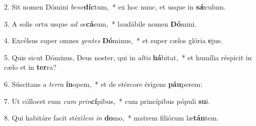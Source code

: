 2. Sit nomen Dómini \textit{be}\textit{ne}\textbf{díc}tum,~*  ex hoc nunc, et usque in \textbf{sǽ}culum.\

3. A solis ortu usque \textit{ad} \textit{oc}\textbf{cá}sum,~*  laudábile nomen \textbf{Dó}mini.\

4. Excélsus super omnes \textit{gen}\textit{tes} \textbf{Dó}minus,~*  et super cælos glória \textbf{e}jus.\

5. Quis sicut Dóminus, Deus noster, qui in \textit{al}\textit{tis} \textbf{há}bitat,~*  et humília réspicit in cælo et in \textbf{ter}ra?\

6. Súscitans a \textit{ter}\textit{ra} \textbf{ín}opem,~*  et de stércore érigens \textbf{páu}perem:\

7. Ut cóllocet eum \textit{cum} \textit{prin}\textbf{cí}pibus,~*  cum princípibus pópuli \textbf{su}i.\

8. Qui habitáre facit stéri\textit{lem} \textit{in} \textbf{do}mo,~*  matrem filiórum læ\textbf{tán}tem.\


